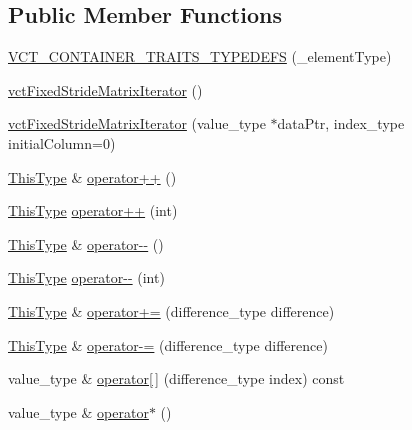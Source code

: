 \subsection*{Public Member Functions}
\begin{DoxyCompactItemize}
\item 
\hyperlink{classvct_fixed_stride_matrix_iterator_a28d34abfd80f4f25b513cc5d34bd4d30}{V\+C\+T\+\_\+\+C\+O\+N\+T\+A\+I\+N\+E\+R\+\_\+\+T\+R\+A\+I\+T\+S\+\_\+\+T\+Y\+P\+E\+D\+E\+F\+S} (\+\_\+element\+Type)
\item 
\hyperlink{classvct_fixed_stride_matrix_iterator_a20b5c57957f2ad4ea87d21c8b5c97a8a}{vct\+Fixed\+Stride\+Matrix\+Iterator} ()
\item 
\hyperlink{classvct_fixed_stride_matrix_iterator_af7c92859228313a66c16fe199eafadf6}{vct\+Fixed\+Stride\+Matrix\+Iterator} (value\+\_\+type $\ast$data\+Ptr, index\+\_\+type initial\+Column=0)
\item 
\hyperlink{classvct_fixed_stride_matrix_const_iterator_a8c6ee7d655fb71d647506c3964a18e2c}{This\+Type} \& \hyperlink{classvct_fixed_stride_matrix_iterator_a7451ed7b876740e9a6920e914bf52bf8}{operator++} ()
\item 
\hyperlink{classvct_fixed_stride_matrix_const_iterator_a8c6ee7d655fb71d647506c3964a18e2c}{This\+Type} \hyperlink{classvct_fixed_stride_matrix_iterator_a720a5f0f8ad585433dc274ba3983a499}{operator++} (int)
\item 
\hyperlink{classvct_fixed_stride_matrix_const_iterator_a8c6ee7d655fb71d647506c3964a18e2c}{This\+Type} \& \hyperlink{classvct_fixed_stride_matrix_iterator_a453c6bf30dcf86d8e9301af2f3edd49b}{operator-\/-\/} ()
\item 
\hyperlink{classvct_fixed_stride_matrix_const_iterator_a8c6ee7d655fb71d647506c3964a18e2c}{This\+Type} \hyperlink{classvct_fixed_stride_matrix_iterator_a5e895f29eb017f6f0676110d73c4d8d5}{operator-\/-\/} (int)
\item 
\hyperlink{classvct_fixed_stride_matrix_const_iterator_a8c6ee7d655fb71d647506c3964a18e2c}{This\+Type} \& \hyperlink{classvct_fixed_stride_matrix_iterator_a54c2f5b3a261e92f478f85fa6ff5038e}{operator+=} (difference\+\_\+type difference)
\item 
\hyperlink{classvct_fixed_stride_matrix_const_iterator_a8c6ee7d655fb71d647506c3964a18e2c}{This\+Type} \& \hyperlink{classvct_fixed_stride_matrix_iterator_a1a9db07b0bcc1387ddfd3a591575e013}{operator-\/=} (difference\+\_\+type difference)
\item 
value\+\_\+type \& \hyperlink{classvct_fixed_stride_matrix_iterator_ad90d735d8eed1aa18b7c727cdb894218}{operator\mbox{[}$\,$\mbox{]}} (difference\+\_\+type index) const 
\item 
value\+\_\+type \& \hyperlink{classvct_fixed_stride_matrix_iterator_a5c12155f392b523b8e51cee767488388}{operator$\ast$} ()
\end{DoxyCompactItemize}
